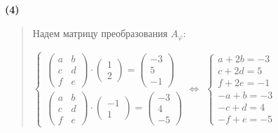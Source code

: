 \documentclass{article}
\begin{document}
\textbf{\textsf{(4)}}
\begin{quote}

Надем матрицу преобразования $A_{\varphi}$:

$
\begin{cases}
    \begin{pmatrix}
        a & b \\ c & d \\ f & e
    \end{pmatrix} \cdot \begin{pmatrix}1 \\ 2\end{pmatrix} = \begin{pmatrix} -3 \\ 5 \\ -1\end{pmatrix} \\
    \begin{pmatrix}
        a & b \\ c & d \\ f & e
    \end{pmatrix} \cdot \begin{pmatrix}-1 \\ 1\end{pmatrix} = \begin{pmatrix} -3 \\ 4 \\ -5\end{pmatrix}
\end{cases} \Longleftrightarrow$
$
\begin{cases}
    a + 2b = -3 \\
    c + 2d = 5 \\
    f + 2e = -1 \\
    -a + b = -3 \\
    -c + d = 4 \\
    -f + e = -5
\end{cases}
$


\end{quote}
\end{document}
